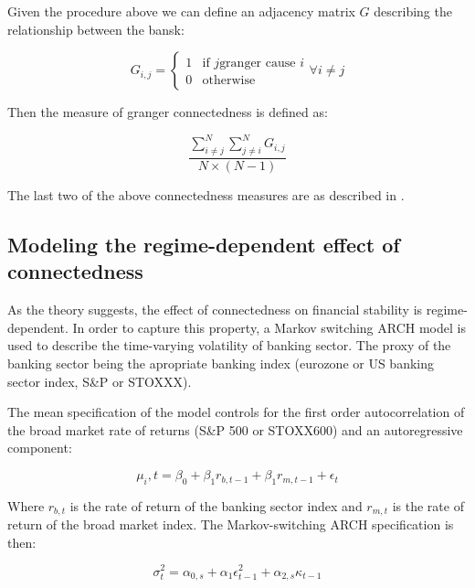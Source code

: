 \documentclass{article}
\begin{document}
Given the procedure above we can define an adjacency matrix $G$ describing the relationship between the bansk:

\[G_{i,j} = \begin{cases}
    1  & \text{if } j \text{granger cause } i \\
    0 & \text{otherwise}
  \end{cases} \forall i \neq j\]

Then the measure of granger connectedness is defined as:

\[\frac{\sum_{i \neq j}^{N} \sum_{j \neq i}^{N} G_{i,j}}{ N \times (N-1)}\]

The last two of the above connectedness measures are as described in \citet{billio}.


\subsection*{Modeling the regime-dependent effect of connectedness}

As the theory suggests, the effect of connectedness on financial stability is regime-dependent. In order to capture this property, a Markov switching ARCH model is used to describe the time-varying volatility of banking sector. The proxy of the banking sector being the apropriate banking index (eurozone or US banking sector index, S\&P or STOXXX).

The mean specification of the model controls for the first order autocorrelation of the broad market rate of returns (S\&P 500 or STOXX600) and an autoregressive component:

\[\mu_i,t = \beta_0 + \beta_1 r_{b,t-1} + \beta_1 r_{m,t-1} + \epsilon_t\]

Where $r_{b,t}$ is the rate of return of the banking sector index and $r_{m,t}$ is the rate of return of the broad market index. The Markov-switching ARCH specification is then:

\[\sigma^2_t = \alpha_{0,s} + \alpha_{1} \epsilon^2_{t-1} + \alpha_{2,s} \kappa_{t-1}\]



\end{document}
